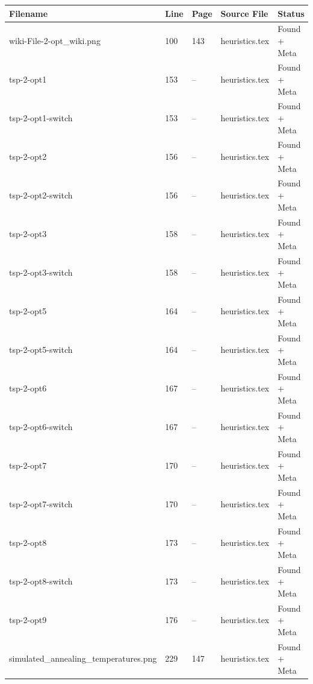 \documentclass[11pt]{article}
\begin{document}
\begin{longtable}{|p{3.5cm}|p{1.5cm}|p{1cm}|p{4cm}|p{2cm}|}
\hline
\textbf{Filename} & \textbf{Line} & \textbf{Page} & \textbf{Source File} & \textbf{Status} \\
\hline
\endhead

wiki-File-2-opt\_wiki.png & 100 & 143 & heuristics.tex & \textcolor{found}{Found + Meta} \\
\hline

tsp-2-opt1 & 153 & -- & heuristics.tex & \textcolor{found}{Found + Meta} \\
\hline

tsp-2-opt1-switch & 153 & -- & heuristics.tex & \textcolor{found}{Found + Meta} \\
\hline

tsp-2-opt2 & 156 & -- & heuristics.tex & \textcolor{found}{Found + Meta} \\
\hline

tsp-2-opt2-switch & 156 & -- & heuristics.tex & \textcolor{found}{Found + Meta} \\
\hline

tsp-2-opt3 & 158 & -- & heuristics.tex & \textcolor{found}{Found + Meta} \\
\hline

tsp-2-opt3-switch & 158 & -- & heuristics.tex & \textcolor{found}{Found + Meta} \\
\hline

tsp-2-opt5 & 164 & -- & heuristics.tex & \textcolor{found}{Found + Meta} \\
\hline

tsp-2-opt5-switch & 164 & -- & heuristics.tex & \textcolor{found}{Found + Meta} \\
\hline

tsp-2-opt6 & 167 & -- & heuristics.tex & \textcolor{found}{Found + Meta} \\
\hline

tsp-2-opt6-switch & 167 & -- & heuristics.tex & \textcolor{found}{Found + Meta} \\
\hline

tsp-2-opt7 & 170 & -- & heuristics.tex & \textcolor{found}{Found + Meta} \\
\hline

tsp-2-opt7-switch & 170 & -- & heuristics.tex & \textcolor{found}{Found + Meta} \\
\hline

tsp-2-opt8 & 173 & -- & heuristics.tex & \textcolor{found}{Found + Meta} \\
\hline

tsp-2-opt8-switch & 173 & -- & heuristics.tex & \textcolor{found}{Found + Meta} \\
\hline

tsp-2-opt9 & 176 & -- & heuristics.tex & \textcolor{found}{Found + Meta} \\
\hline

simulated\_annealing\_temperatures.png & 229 & 147 & heuristics.tex & \textcolor{found}{Found + Meta} \\
\hline

\end{longtable}
\end{document}
